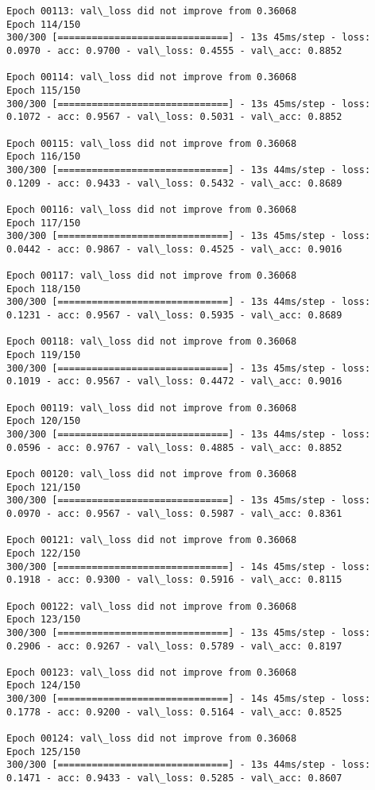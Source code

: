 \documentclass[11pt]{article}
\begin{document}
\begin{Verbatim}[commandchars=\\\{\}]
Epoch 00113: val\_loss did not improve from 0.36068
Epoch 114/150
300/300 [==============================] - 13s 45ms/step - loss: 0.0970 - acc: 0.9700 - val\_loss: 0.4555 - val\_acc: 0.8852

Epoch 00114: val\_loss did not improve from 0.36068
Epoch 115/150
300/300 [==============================] - 13s 45ms/step - loss: 0.1072 - acc: 0.9567 - val\_loss: 0.5031 - val\_acc: 0.8852

Epoch 00115: val\_loss did not improve from 0.36068
Epoch 116/150
300/300 [==============================] - 13s 44ms/step - loss: 0.1209 - acc: 0.9433 - val\_loss: 0.5432 - val\_acc: 0.8689

Epoch 00116: val\_loss did not improve from 0.36068
Epoch 117/150
300/300 [==============================] - 13s 45ms/step - loss: 0.0442 - acc: 0.9867 - val\_loss: 0.4525 - val\_acc: 0.9016

Epoch 00117: val\_loss did not improve from 0.36068
Epoch 118/150
300/300 [==============================] - 13s 44ms/step - loss: 0.1231 - acc: 0.9567 - val\_loss: 0.5935 - val\_acc: 0.8689

Epoch 00118: val\_loss did not improve from 0.36068
Epoch 119/150
300/300 [==============================] - 13s 45ms/step - loss: 0.1019 - acc: 0.9567 - val\_loss: 0.4472 - val\_acc: 0.9016

Epoch 00119: val\_loss did not improve from 0.36068
Epoch 120/150
300/300 [==============================] - 13s 44ms/step - loss: 0.0596 - acc: 0.9767 - val\_loss: 0.4885 - val\_acc: 0.8852

Epoch 00120: val\_loss did not improve from 0.36068
Epoch 121/150
300/300 [==============================] - 13s 45ms/step - loss: 0.0970 - acc: 0.9567 - val\_loss: 0.5987 - val\_acc: 0.8361

Epoch 00121: val\_loss did not improve from 0.36068
Epoch 122/150
300/300 [==============================] - 14s 45ms/step - loss: 0.1918 - acc: 0.9300 - val\_loss: 0.5916 - val\_acc: 0.8115

Epoch 00122: val\_loss did not improve from 0.36068
Epoch 123/150
300/300 [==============================] - 13s 45ms/step - loss: 0.2906 - acc: 0.9267 - val\_loss: 0.5789 - val\_acc: 0.8197

Epoch 00123: val\_loss did not improve from 0.36068
Epoch 124/150
300/300 [==============================] - 14s 45ms/step - loss: 0.1778 - acc: 0.9200 - val\_loss: 0.5164 - val\_acc: 0.8525

Epoch 00124: val\_loss did not improve from 0.36068
Epoch 125/150
300/300 [==============================] - 13s 44ms/step - loss: 0.1471 - acc: 0.9433 - val\_loss: 0.5285 - val\_acc: 0.8607


\end{Verbatim}
\end{document}

